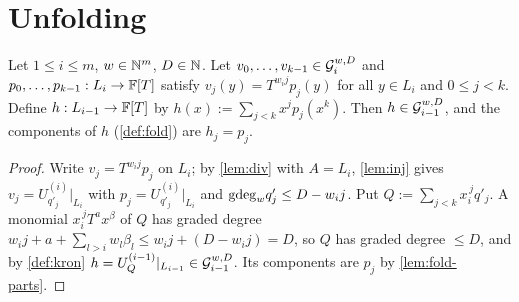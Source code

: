 \section{Unfolding}

\begin{lemma}[Unfolding]\label{lem:unfold}
Let $1\le i\le m$, $w\in\mathbb{N}^m$, $D\in\mathbb{N}$. Let $v_0,\dots,v_{k-1}\in\mathcal{G}_i^{w,D}$ and
$p_0,\dots,p_{k-1}:L_i\to\mathbb{F}[T]$ satisfy $v_j(y)=T^{w_ij}p_j(y)$ for all $y\in L_i$ and
$0\le j<k$. Define $h:L_{i-1}\to\mathbb{F}[T]$ by $h(x):=\sum_{j<k}x^jp_j(x^k)$. Then
$h\in\mathcal{G}_{i-1}^{w,D}$, and the components of $h$ (\cref{def:fold}) are $h_j=p_j$.
\end{lemma}

\begin{proof}
Write $v_j=T^{w_ij}p_j$ on $L_i$; by \cref{lem:div} with $A=L_i$, \cref{lem:inj} gives
$v_j=U^{(i)}_{q'_j}|_{L_i}$ with $p_j=U^{(i)}_{q'_j}|_{L_i}$ and $\mathrm{gdeg}_w q'_j\le D-w_ij$.
Put $Q:=\sum_{j<k}x_i^{\,j}q'_j$. A monomial $x_i^{\,j}T^ax^\beta$ of $Q$ has graded degree
$w_ij+a+\sum_{l>i}w_l\beta_l\le w_ij+(D-w_ij)=D$, so $Q$ has graded degree $\le D$, and by
\cref{def:kron} $h=U^{(i-1)}_Q|_{L_{i-1}}\in\mathcal{G}_{i-1}^{w,D}$. Its components are $p_j$ by
\cref{lem:fold-parts}.
\end{proof}

